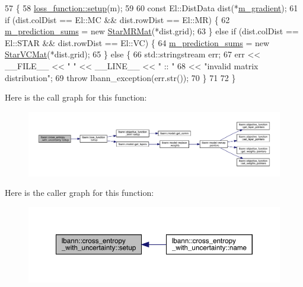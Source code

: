 \begin{DoxyCode}
57                                                    \{
58   \hyperlink{classlbann_1_1loss__function_a17a3629e8519c4215ad776a0c7b522ae}{loss\_function::setup}(m);
59 
60   \textcolor{keyword}{const} El::DistData dist(*\hyperlink{classlbann_1_1loss__function_ac6ac9f8f2cef7a4daa1b282dba914975}{m\_gradient});
61   \textcolor{keywordflow}{if} (dist.colDist == El::MC && dist.rowDist == El::MR) \{
62     \hyperlink{classlbann_1_1cross__entropy__with__uncertainty_a4b45767c526e7ebe4a55ff1a1ddbd7ba}{m\_prediction\_sums} = \textcolor{keyword}{new} \hyperlink{base_8hpp_a638c3ca7c22f916d23415b234420b9f1}{StarMRMat}(*dist.grid);
63   \} \textcolor{keywordflow}{else} \textcolor{keywordflow}{if} (dist.colDist == El::STAR && dist.rowDist == El::VC) \{
64     \hyperlink{classlbann_1_1cross__entropy__with__uncertainty_a4b45767c526e7ebe4a55ff1a1ddbd7ba}{m\_prediction\_sums} = \textcolor{keyword}{new} \hyperlink{base_8hpp_aa4ec814c4a8f15b4ea2b24b3af94ef23}{StarVCMat}(*dist.grid);
65   \} \textcolor{keywordflow}{else} \{
66     std::stringstream err;
67     err << \_\_FILE\_\_ << \textcolor{stringliteral}{" "} << \_\_LINE\_\_ << \textcolor{stringliteral}{" :: "}
68         << \textcolor{stringliteral}{"invalid matrix distribution"};
69     \textcolor{keywordflow}{throw} lbann\_exception(err.str());
70   \}
71 
72 \}
\end{DoxyCode}
Here is the call graph for this function\+:\nopagebreak
\begin{figure}[H]
\begin{center}
\leavevmode
\includegraphics[width=350pt]{classlbann_1_1cross__entropy__with__uncertainty_a44a47468f1d04734068d085417eeab93_cgraph}
\end{center}
\end{figure}
Here is the caller graph for this function\+:\nopagebreak
\begin{figure}[H]
\begin{center}
\leavevmode
\includegraphics[width=350pt]{classlbann_1_1cross__entropy__with__uncertainty_a44a47468f1d04734068d085417eeab93_icgraph}
\end{center}
\end{figure}
